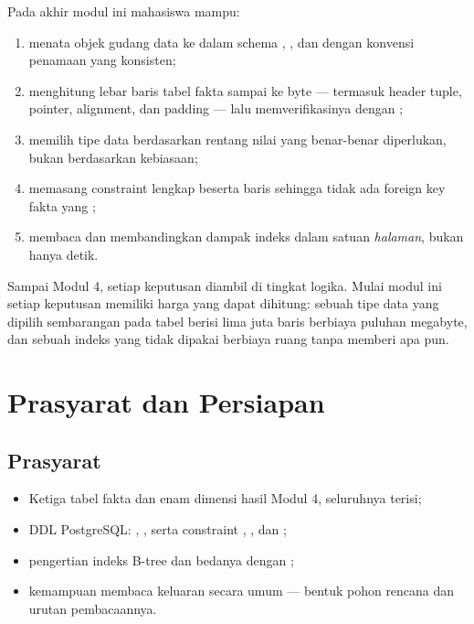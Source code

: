 \begin{capaian}
Pada akhir modul ini mahasiswa mampu:
\begin{enumerate}[leftmargin=1.4em]
  \item menata objek gudang data ke dalam schema ,
        , dan  dengan konvensi penamaan yang
        konsisten;
  \item menghitung lebar baris tabel fakta sampai ke byte --- termasuk header
        tuple, pointer, alignment, dan padding --- lalu memverifikasinya dengan
        ;
  \item memilih tipe data berdasarkan rentang nilai yang benar-benar
        diperlukan, bukan berdasarkan kebiasaan;
  \item memasang constraint lengkap beserta baris  sehingga
        tidak ada foreign key fakta yang ;
  \item membaca  dan membandingkan dampak
        indeks dalam satuan \emph{halaman}, bukan hanya detik.
\end{enumerate}
\end{capaian}

Sampai Modul 4, setiap keputusan diambil di tingkat logika. Mulai modul ini
setiap keputusan memiliki harga yang dapat dihitung: sebuah tipe data yang
dipilih sembarangan pada tabel berisi lima juta baris berbiaya puluhan
megabyte, dan sebuah indeks yang tidak dipakai berbiaya ruang tanpa memberi apa
pun.

\section{Prasyarat dan Persiapan}

\subsection{Prasyarat}

\begin{itemize}
  \item Ketiga tabel fakta dan enam dimensi hasil Modul 4, seluruhnya terisi;
  \item DDL PostgreSQL: , , serta
        constraint , , dan
        ;
  \item pengertian indeks B-tree dan bedanya dengan ;
  \item kemampuan membaca keluaran  secara umum --- bentuk
        pohon rencana dan urutan pembacaannya.
\end{itemize}

